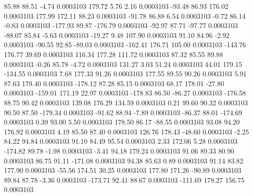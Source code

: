        85.88       88.51       -4.74     0.0003103
      179.72        5.76        2.16     0.0003103
      -93.48       86.93      176.02     0.0003103
      177.99      172.11       88.23     0.0003103
      -91.78       86.88        6.54     0.0003103
       -0.72       86.14       -0.83     0.0003103
     -177.93       89.87     -176.79     0.0003103
      -92.97       87.71      -97.77     0.0003103
      -88.07       85.84       -5.63     0.0003103
      -19.27        9.48      107.90     0.0003103
       91.10       84.96       -2.92     0.0003103
      -90.55       92.85      -89.03     0.0003103
     -162.41      176.71      105.00     0.0003103
     -143.76      176.77       39.69     0.0003103
      116.34      177.28      111.72     0.0003103
       87.32       85.55       89.88     0.0003103
       -0.26       85.78       -4.72     0.0003103
      131.27        3.03       51.24     0.0003103
       44.01      179.15     -134.55     0.0003103
        7.68      177.33       91.26     0.0003103
      177.55       89.55       90.26     0.0003103
        5.91       87.63      179.40     0.0003103
     -178.12       87.28       85.15     0.0003103
       68.17      178.01      -27.80     0.0003103
     -159.01      171.19       22.97     0.0003103
     -178.83       86.50      -86.27     0.0003103
     -176.58       88.75       90.42     0.0003103
      139.08      176.29      134.59     0.0003103
        0.21       99.60       90.32     0.0003103
       90.50       87.50     -179.34     0.0003103
      -91.62       88.94       -7.89     0.0003103
      -86.37       88.01     -174.69     0.0003103
        0.39       93.00        5.50     0.0003103
      178.50       86.17      -88.55     0.0003103
       93.08       94.20      176.92     0.0003103
        4.19       85.50       87.40     0.0003103
      126.76      178.43      -48.60     0.0003103
       -2.25       84.22       94.84     0.0003103
       91.10       84.49       95.54     0.0003103
        2.33      172.06        5.28     0.0003103
     -174.82       89.78       -1.98     0.0003103
       -3.41       94.18      179.24     0.0003103
       91.06       89.33       80.90     0.0003103
       86.75       91.11     -171.08     0.0003103
       94.38       85.63        0.89     0.0003103
       91.14       83.82      177.90     0.0003103
      -55.56      174.51       30.25     0.0003103
      177.80      171.26      -90.89     0.0003103
       89.84       87.78       -3.36     0.0003103
     -173.71       92.41       88.67     0.0003103
     -111.69      178.27      156.75     0.0003103
